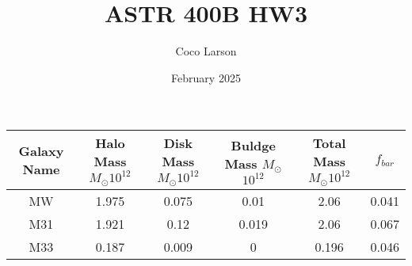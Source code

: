 \documentclass{article}
\title{ASTR 400B HW3}
\author{Coco Larson}
\date{February 2025}
\begin{document}
\maketitle

\begin{center}
\begin{tabular}{c c c c c c}
Galaxy Name & Halo Mass $M_{\odot}$$10^{12}$ & Disk Mass $M_{\odot}$$10^{12}$ & Buldge Mass $M_{\odot}$
$10^{12}$ & Total Mass $M_{\odot}$$10^{12}$ & $f_{bar}$\\ 
\hline
MW & 1.975 & 0.075 & 0.01 & 2.06 & 0.041 \\  
\hline
M31 & 1.921 & 0.12 & 0.019 & 2.06 & 0.067 \\  
\hline
M33 & 0.187 & 0.009 & 0 & 0.196 & 0.046 \\ 
\hline
\end{tabular}
\end{center}
\end{document}
